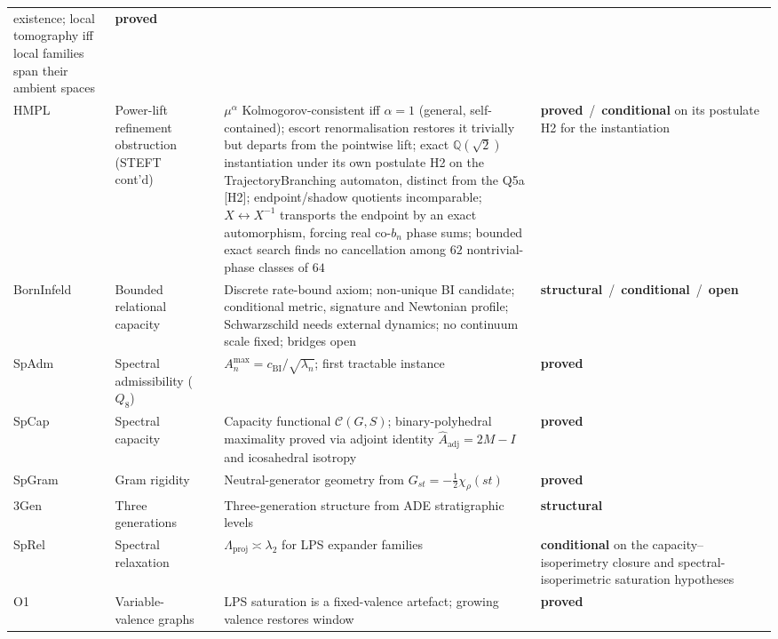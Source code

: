 \documentclass[11pt,a4paper]{article}
\newcommand{\sproved}{\textcolor{cproved}{\textbf{proved}}}
\newcommand{\sstruct}{\textcolor{cstruct}{\textbf{structural}}}
\newcommand{\sopen}{\textcolor{copen}{\textbf{open}}}
\newcommand{\scond}{\textcolor{ccond}{\textbf{conditional}}}
\begin{document}
\begin{longtable}{@{}p{1.70cm}p{2.9cm}p{1.3cm}p{6.25cm}>{\raggedright\arraybackslash}p{2.0cm}@{}}
      existence; local tomography iff local families span their ambient spaces &
      \sproved \\[3pt]
      HMPL & Power-lift refinement obstruction (STEFT cont'd) & \cite{Beau2026hmpl} &
      $\mu^\alpha$ Kolmogorov-consistent iff $\alpha=1$ (general, self-contained); escort renormalisation
      restores it trivially but departs from the pointwise lift; exact $\mathbb{Q}(\sqrt2)$ instantiation
      under its own postulate H2 on the TrajectoryBranching automaton, distinct from the Q5a [H2]; endpoint/shadow
      quotients incomparable;
      $X\leftrightarrow X^{-1}$ transports the endpoint by an exact automorphism, forcing real co-$b_n$
      phase sums; bounded exact search finds no cancellation among $62$ nontrivial-phase classes of $64$ &
      \sproved\ /\ \scond{} on its postulate H2 for the instantiation \\[3pt]
      \midrule
      Born\-Infeld & Bounded relational capacity & \cite{Beau2026c} &
      Discrete rate-bound axiom; non-unique BI candidate; conditional metric, signature and Newtonian profile;
      Schwarzschild needs external dynamics; no continuum scale fixed; bridges open &
      \sstruct\ /\ \scond\ /\ \sopen \\[3pt]
      SpAdm & Spectral admissibility ($Q_8$) & \cite{Beau2026a1} &
      $A^{\max}_n = c_{\mathrm{BI}}/\sqrt{\lambda_n}$; first tractable instance &
      \sproved \\[3pt]
      SpCap & Spectral capacity & \cite{Beau2026a2} &
      Capacity functional $\mathcal{C}(G,S)$; binary-polyhedral maximality proved via
      adjoint identity $\hat{A}_{\mathrm{adj}} = 2M - I$ and icosahedral isotropy &
      \sproved \\[3pt]
      SpGram & Gram rigidity & \cite{Beau2026a3} &
      Neutral-generator geometry from $G_{st} = -\tfrac{1}{2}\chi_\rho(st)$ &
      \sproved \\[3pt]
      3Gen & Three generations & \cite{Beau2026a4} &
      Three-generation structure from ADE stratigraphic levels &
      \sstruct \\[3pt]
      SpRel & Spectral relaxation & \cite{Beau2026a5} &
      $\Lambda_{\mathrm{proj}} \asymp \lambda_2$ for LPS expander families &
      \scond{} on the capacity--isoperimetry closure and spectral-isoperimetric saturation hypotheses \\[3pt]
      \midrule
      O1 & Variable-valence graphs & \cite{Beau2026a6} &
      LPS saturation is a fixed-valence artefact; growing valence restores window &
      \sproved \\[3pt]

\end{longtable}
\end{document}
